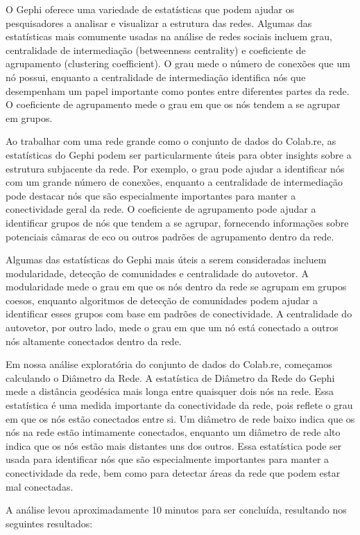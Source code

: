O Gephi oferece uma variedade de estatísticas que podem ajudar os pesquisadores a analisar e visualizar a estrutura das redes. Algumas das estatísticas mais comumente usadas na análise de redes sociais incluem grau, centralidade de intermediação (betweenness centrality) e coeficiente de agrupamento (clustering coefficient). O grau mede o número de conexões que um nó possui, enquanto a centralidade de intermediação identifica nós que desempenham um papel importante como pontes entre diferentes partes da rede. O coeficiente de agrupamento mede o grau em que os nós tendem a se agrupar em grupos.

Ao trabalhar com uma rede grande como o conjunto de dados do Colab.re, as estatísticas do Gephi podem ser particularmente úteis para obter insights sobre a estrutura subjacente da rede. Por exemplo, o grau pode ajudar a identificar nós com um grande número de conexões, enquanto a centralidade de intermediação pode destacar nós que são especialmente importantes para manter a conectividade geral da rede. O coeficiente de agrupamento pode ajudar a identificar grupos de nós que tendem a se agrupar, fornecendo informações sobre potenciais câmaras de eco ou outros padrões de agrupamento dentro da rede.

Algumas das estatísticas do Gephi mais úteis a serem consideradas incluem modularidade, detecção de comunidades e centralidade do autovetor. A modularidade mede o grau em que os nós dentro da rede se agrupam em grupos coesos, enquanto algoritmos de detecção de comunidades podem ajudar a identificar esses grupos com base em padrões de conectividade. A centralidade do autovetor, por outro lado, mede o grau em que um nó está conectado a outros nós altamente conectados dentro da rede.

Em nossa análise exploratória do conjunto de dados do Colab.re, começamos calculando o Diâmetro da Rede. A estatística de Diâmetro da Rede do Gephi mede a distância geodésica mais longa entre quaisquer dois nós na rede. Essa estatística é uma medida importante da conectividade da rede, pois reflete o grau em que os nós estão conectados entre si. Um diâmetro de rede baixo indica que os nós na rede estão intimamente conectados, enquanto um diâmetro de rede alto indica que os nós estão mais distantes uns dos outros. Essa estatística pode ser usada para identificar nós que são especialmente importantes para manter a conectividade da rede, bem como para detectar áreas da rede que podem estar mal conectadas.

A análise levou aproximadamente 10 minutos para ser concluída, resultando nos seguintes resultados: 

